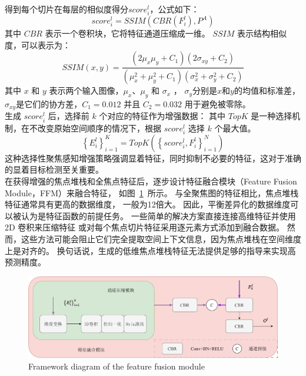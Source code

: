 得到每个切片在每层的相似度得分$score_{i}^{l}$，公式如下：
\begin{equation}
	score_{i}^{l} = SSIM \left ( CBR \left ( F_{i}^{l} \right ), P^{A} \right )
\end{equation}
%
%
其中 $CBR$ 表示一个卷积块，它将特征通道压缩成一维。 $SSIM$ 表示结构相似度，可以表示为： 
%
%
\begin{equation} 	
	SSIM(x,y)=\frac{\left ( 2\mu_{x}\mu_{y}+C_{1} \right ) \left (  2\sigma_{xy}+C_{2} \right )  } 	
	{\left ( \mu_{x}^{2} + \mu_{y}^{2}+C_{1}\right ) \left ( \sigma_{x}^{2}+ \sigma_{y}^{2} + C_{2} \right ) } 
\end{equation}
其中 $x$ 和 $y$ 表示两个输入图像，$\mu_{x}$、$\mu_{y}$ 和 $\sigma_{x}$ ， $\sigma_{y}$分别是$x$和$y$的均值和标准差，$\sigma_{xy}$是它们的协方差，$C_{1} = 0.012$ 并且 $C_{2} = 0.032$ 用于避免被零除。 
\\
%
%
%
%
\indent
生成 $ score_{i}^{l} $ 后，选择前 $k$ 个对应的特征作为增强数据：
其中 $ TopK $ 是一种选择机制，在不改变原始空间顺序的情况下，根据 $ score_{i}^{l} $ 选择 $k$ 个最大值。 
\begin{equation}
	\left \{ E_{i}^{l} \right \}_{i=1}^{K} = TopK \left ( \left \{ score_{i}^{l}, F_{i}^{l} \right \}_{i=1}^{N} \right )
\end{equation}
%
%
这种选择性聚焦感知增强策略强调显着特征，同时抑制不必要的特征，这对于准确的显着目标检测至关重要。
\\
%
%
%
%
\indent
在获得增强的焦点堆栈和全焦点特征后，逐步设计特征融合模块（Feature Fusion Module，FFM）来融合特征，
如图~\ref{cpt3_fig1:ccm}~所示。
与全聚焦图的特征相比，焦点堆栈特征通常具有更高的数据维度， 一般为12倍大。 
因此，平衡差异化的数据维度可以被认为是特征函数的前提任务。
一些简单的解决方案直接连接高维特征并使用 2D 卷积来压缩特征
或对每个焦点切片特征采用逐元素方式添加到融合数据。 然而，这些方法可能会阻止它们完全提取空间上下文信息，因为焦点堆栈在空间维度上是对齐的。 换句话说，生成的低维焦点堆栈特征无法提供足够的指导来实现高预测精度。 
\begin{figure}[t]
	\centering
	\includegraphics[width=0.95\linewidth]{figures/chapter3/ccm}
	{Framework diagram of the feature fusion module}
	\label{cpt3_fig1:ccm}
\end{figure}
